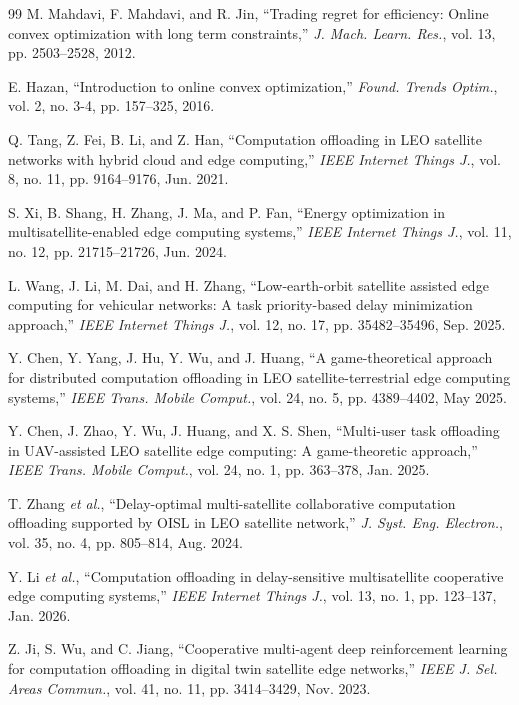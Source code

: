 \documentclass[a4paper,11pt]{article}
\begin{document}
\begin{thebibliography}{99}
M. Mahdavi, F. Mahdavi, and R. Jin,
``Trading regret for efficiency: Online convex optimization
with long term constraints,''
\textit{J. Mach. Learn. Res.},
vol. 13, pp. 2503--2528, 2012.

E. Hazan,
``Introduction to online convex optimization,''
\textit{Found. Trends Optim.},
vol. 2, no. 3-4, pp. 157--325, 2016.

Q. Tang, Z. Fei, B. Li, and Z. Han,
``Computation offloading in LEO satellite networks with hybrid
cloud and edge computing,''
\textit{IEEE Internet Things J.},
vol. 8, no. 11, pp. 9164--9176, Jun. 2021.

S. Xi, B. Shang, H. Zhang, J. Ma, and P. Fan,
``Energy optimization in multisatellite-enabled edge computing systems,''
\textit{IEEE Internet Things J.},
vol. 11, no. 12, pp. 21715--21726, Jun. 2024.

L. Wang, J. Li, M. Dai, and H. Zhang,
``Low-earth-orbit satellite assisted edge computing for vehicular
networks: A task priority-based delay minimization approach,''
\textit{IEEE Internet Things J.},
vol. 12, no. 17, pp. 35482--35496, Sep. 2025.

Y. Chen, Y. Yang, J. Hu, Y. Wu, and J. Huang,
``A game-theoretical approach for distributed computation offloading
in LEO satellite-terrestrial edge computing systems,''
\textit{IEEE Trans. Mobile Comput.},
vol. 24, no. 5, pp. 4389--4402, May 2025.

Y. Chen, J. Zhao, Y. Wu, J. Huang, and X. S. Shen,
``Multi-user task offloading in UAV-assisted LEO satellite edge
computing: A game-theoretic approach,''
\textit{IEEE Trans. Mobile Comput.},
vol. 24, no. 1, pp. 363--378, Jan. 2025.

T. Zhang \textit{et al.},
``Delay-optimal multi-satellite collaborative computation offloading
supported by OISL in LEO satellite network,''
\textit{J. Syst. Eng. Electron.},
vol. 35, no. 4, pp. 805--814, Aug. 2024.

Y. Li \textit{et al.},
``Computation offloading in delay-sensitive multisatellite
cooperative edge computing systems,''
\textit{IEEE Internet Things J.},
vol. 13, no. 1, pp. 123--137, Jan. 2026.

Z. Ji, S. Wu, and C. Jiang,
``Cooperative multi-agent deep reinforcement learning for computation
offloading in digital twin satellite edge networks,''
\textit{IEEE J. Sel. Areas Commun.},
vol. 41, no. 11, pp. 3414--3429, Nov. 2023.


\end{thebibliography}
\end{document}

